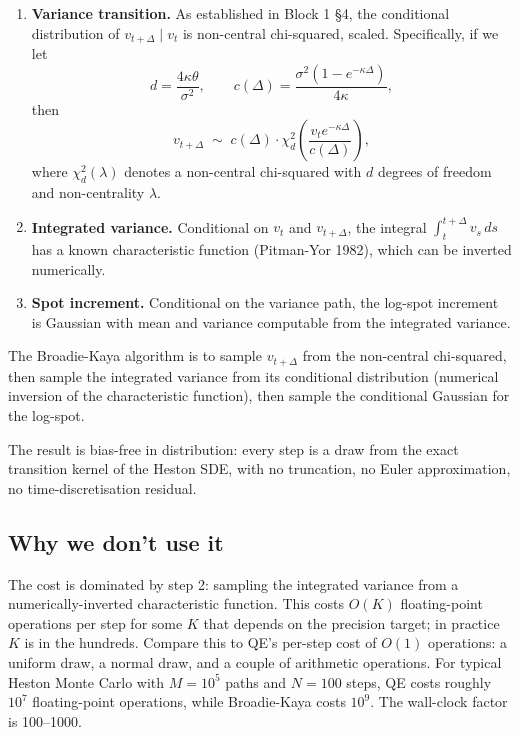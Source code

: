 \documentclass[11pt]{article}
\theoremstyle{plain}
\theoremstyle{definition}
\theoremstyle{remark}
\begin{document}
\begin{enumerate}[topsep=2pt]
    \item \textbf{Variance transition.} As established in Block 1 \S4, the conditional distribution of $v_{t+\Delta} \mid v_t$ is non-central chi-squared, scaled. Specifically, if we let
    \[
        d = \frac{4\kappa\theta}{\sigma^2}, \qquad
        c(\Delta) = \frac{\sigma^2 (1 - e^{-\kappa\Delta})}{4\kappa},
    \]
    then
    \[
        v_{t+\Delta} \;\sim\; c(\Delta) \cdot \chi^2_d\!\left(\frac{v_t e^{-\kappa\Delta}}{c(\Delta)}\right),
    \]
    where $\chi^2_d(\lambda)$ denotes a non-central chi-squared with $d$ degrees of freedom and non-centrality $\lambda$.

    \item \textbf{Integrated variance.} Conditional on $v_t$ and $v_{t+\Delta}$, the integral $\int_t^{t+\Delta} v_s\,ds$ has a known characteristic function (Pitman-Yor 1982), which can be inverted numerically.

    \item \textbf{Spot increment.} Conditional on the variance path, the log-spot increment is Gaussian with mean and variance computable from the integrated variance.
\end{enumerate}

The Broadie-Kaya algorithm is to sample $v_{t+\Delta}$ from the non-central chi-squared, then sample the integrated variance from its conditional distribution (numerical inversion of the characteristic function), then sample the conditional Gaussian for the log-spot.

The result is bias-free in distribution: every step is a draw from the exact transition kernel of the Heston SDE, with no truncation, no Euler approximation, no time-discretisation residual.

\subsection{Why we don't use it}

The cost is dominated by step 2: sampling the integrated variance from a numerically-inverted characteristic function. This costs $O(K)$ floating-point operations per step for some $K$ that depends on the precision target; in practice $K$ is in the hundreds. Compare this to QE's per-step cost of $O(1)$ operations: a uniform draw, a normal draw, and a couple of arithmetic operations. For typical Heston Monte Carlo with $M = 10^5$ paths and $N = 100$ steps, QE costs roughly $10^7$ floating-point operations, while Broadie-Kaya costs $10^9$. The wall-clock factor is 100--1000.
\end{document}
